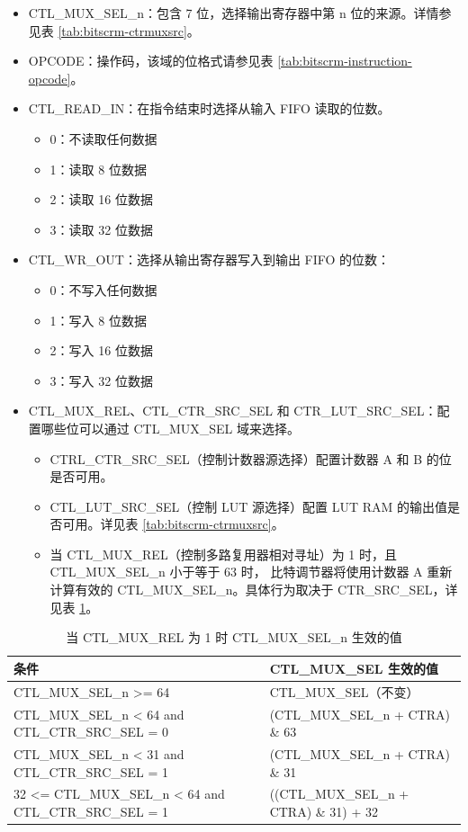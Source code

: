 \documentclass[main\_\_CN.tex]{subfiles}
\begin{document}
\begin{itemize}
\item CTL\_MUX\_SEL\_n：包含 7 位，选择输出寄存器中第 n 位的来源。详情参见表 \ref{tab:bitscrm-ctrmuxsrc}。
\item OPCODE：操作码，该域的位格式请参见表 \ref{tab:bitscrm-instruction-opcode}。
\item CTL\_READ\_IN：在指令结束时选择从输入 FIFO 读取的位数。

\begin{itemize}
\item 0：不读取任何数据
\item 1：读取 8 位数据
\item 2：读取 16 位数据
\item 3：读取 32 位数据
\end{itemize}

\item CTL\_WR\_OUT：选择从输出寄存器写入到输出 FIFO 的位数：

\begin{itemize}
\item 0：不写入任何数据
\item 1：写入 8 位数据
\item 2：写入 16 位数据
\item 3：写入 32 位数据
\end{itemize}

\item CTL\_MUX\_REL、CTL\_CTR\_SRC\_SEL 和 CTR\_LUT\_SRC\_SEL：配置哪些位可以通过 CTL\_MUX\_SEL 域来选择。

\begin{itemize}
    \item CTRL\_CTR\_SRC\_SEL（控制计数器源选择）配置计数器 A 和 B 的位是否可用。
    \item CTL\_LUT\_SRC\_SEL（控制 LUT 源选择）配置 LUT RAM 的输出值是否可用。详见表 \ref{tab:bitscrm-ctrmuxsrc}。
    \item 当 CTL\_MUX\_REL（控制多路复用器相对寻址）为 1 时，且 CTL\_MUX\_SEL\_n 小于等于 63 时， 比特调节器将使用计数器 A 重新计算有效的 CTL\_MUX\_SEL\_n。具体行为取决于 CTR\_SRC\_SEL，详见表 \ref{tab:bitscrm-ctrmuxrel}。
\end{itemize}

\end{itemize}


\begin{table}[H]
\centering
\caption{当 CTL\_MUX\_REL 为 1 时 CTL\_MUX\_SEL\_n 生效的值}
\label{tab:bitscrm-ctrmuxrel}
\begin{tabular}{|l|l|}
\hline\rowcolor{lightgray}
条件 & CTL\_MUX\_SEL 生效的值\\
\hline
CTL\_MUX\_SEL\_n >= 64 & CTL\_MUX\_SEL（不变） \\
CTL\_MUX\_SEL\_n < 64 and CTL\_CTR\_SRC\_SEL = 0 & (CTL\_MUX\_SEL\_n + CTRA) \& 63 \\
CTL\_MUX\_SEL\_n < 31 and CTL\_CTR\_SRC\_SEL = 1 & (CTL\_MUX\_SEL\_n + CTRA) \& 31 \\
32 <= CTL\_MUX\_SEL\_n < 64 and CTL\_CTR\_SRC\_SEL = 1 & ((CTL\_MUX\_SEL\_n + CTRA) \& 31) + 32 \\
\hline
\end{tabular}
\end{table}
\end{document}
